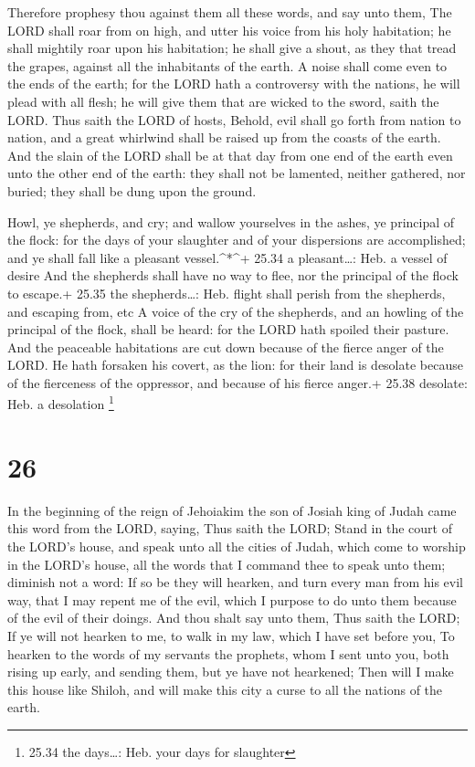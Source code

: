  Therefore prophesy thou against them all these words, and
say unto them, The LORD shall roar from on high, and utter his voice
from his holy habitation; he shall mightily roar upon his habitation; he
shall give a shout, as they that tread the grapes, against all the
inhabitants of the earth.  A noise shall come even to the
ends of the earth; for the LORD hath a controversy with the nations, he
will plead with all flesh; he will give them that are wicked to the
sword, saith the LORD.  Thus saith the LORD of hosts,
Behold, evil shall go forth from nation to nation, and a great whirlwind
shall be raised up from the coasts of the earth.  And the
slain of the LORD shall be at that day from one end of the earth even
unto the other end of the earth: they shall not be lamented, neither
gathered, nor buried; they shall be dung upon the ground.

 Howl, ye shepherds, and cry; and wallow yourselves in the
ashes, ye principal of the flock: for the days of your slaughter and of
your dispersions are accomplished; and ye shall fall like a pleasant
vessel.\^{}*\^{}+ 25.34 a pleasant\ldots: Heb. a vessel of desire
 And the shepherds shall have no way to flee, nor the
principal of the flock to escape.+ 25.35 the shepherds\ldots: Heb.
flight shall perish from the shepherds, and escaping from, etc
 A voice of the cry of the shepherds, and an howling of the
principal of the flock, shall be heard: for the LORD hath spoiled their
pasture.  And the peaceable habitations are cut down
because of the fierce anger of the LORD.  He hath forsaken
his covert, as the lion: for their land is desolate because of the
fierceness of the oppressor, and because of his fierce anger.+ 25.38
desolate: Heb. a desolation \footnote{25.34 the days\ldots: Heb. your
  days for slaughter}

\hypertarget{section-25}{%
\section{26}\label{section-25}}

 In the beginning of the reign of Jehoiakim the son of
Josiah king of Judah came this word from the LORD, saying, 
Thus saith the LORD; Stand in the court of the LORD's house, and speak
unto all the cities of Judah, which come to worship in the LORD's house,
all the words that I command thee to speak unto them; diminish not a
word:  If so be they will hearken, and turn every man from
his evil way, that I may repent me of the evil, which I purpose to do
unto them because of the evil of their doings.  And thou
shalt say unto them, Thus saith the LORD; If ye will not hearken to me,
to walk in my law, which I have set before you,  To hearken
to the words of my servants the prophets, whom I sent unto you, both
rising up early, and sending them, but ye have not hearkened;
 Then will I make this house like Shiloh, and will make this
city a curse to all the nations of the earth.

